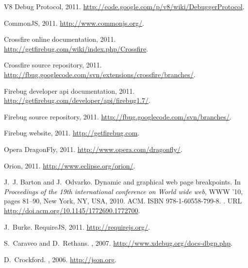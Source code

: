 \documentclass[10pt]{sigplanconf}
\begin{document}
\begin{thebibliography}{27}
V8 {D}ebug {P}rotocol, 2011.
\newblock \url{http://code.google.com/p/v8/wiki/DebuggerProtocol}.

Common{JS}, 2011.
\newblock \url{http://www.commonjs.org/}.

Crossfire online documentation, 2011{}.
\newblock \url{http://getfirebug.com/wiki/index.php/Crossfire}.

Crossfire source repository, 2011{}.
\newblock \url{http://fbug.googlecode.com/svn/extensions/crossfire/branches/}.

Firebug developer api documentation, 2011{}.
\newblock \url{http://getfirebug.com/developer/api/firebug1.7/}.

Firebug source repository, 2011{}.
\newblock \url{http://fbug.googlecode.com/svn/branches/}.

Firebug website, 2011.
\newblock \url{http://getfirebug.com}.

Opera {D}ragon{F}ly, 2011.
\newblock \url{http://www.opera.com/dragonfly/}.

\vfill\eject

Orion, 2011.
\newblock \url{http://www.eclipse.org/orion/}.

J.~J. Barton and J.~Odvarko.
\newblock Dynamic and graphical web page breakpoints.
\newblock In \emph{Proceedings of the 19th international conference on World
  wide web}, WWW '10, pages 81--90, New York, NY, USA, 2010. ACM.
\newblock ISBN 978-1-60558-799-8.
\newblock {}.
\newblock URL \url{http://doi.acm.org/10.1145/1772690.1772700}.

J.~Burke.
\newblock Require{JS}, 2011.
\newblock \url{http://requirejs.org/}.

S.~Caraveo and D.~Rethans.
, 2007.
\newblock \url{http://www.xdebug.org/docs-dbgp.php}.

D.~Crockford.
, 2006.
\newblock \url{http://json.org}.


\end{thebibliography}
\end{document}
